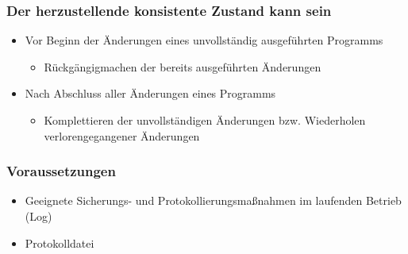 \subsubsection{Der herzustellende konsistente Zustand kann sein}
\begin{itemize}
	\item Vor Beginn der Änderungen eines unvollständig ausgeführten Programms
		\begin{itemize}
			\item Rückgängigmachen der bereits ausgeführten Änderungen
		\end{itemize}
	\item Nach Abschluss aller Änderungen eines Programms
		\begin{itemize}
			\item Komplettieren der unvollständigen Änderungen bzw. Wiederholen verlorengegangener Änderungen 
		\end{itemize}
\end{itemize}
\subsubsection{Voraussetzungen}
\begin{itemize}
	\item Geeignete Sicherungs- und Protokollierungsmaßnahmen im laufenden Betrieb (Log)
	\item Protokolldatei
\end{itemize}


